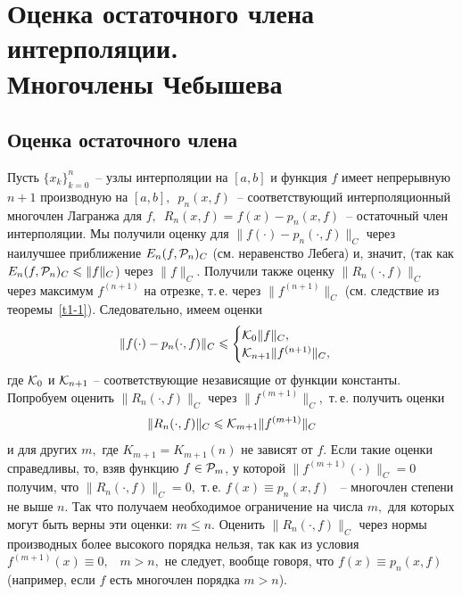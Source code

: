 
\chapter{Оценка остаточного члена интерполяции.\\
Многочлены Чебышева} %

\section{Оценка остаточного члена}

Пусть {$\{x_k\}^n_{k=0}$}~-- узлы интерполяции на $[a,b]$ и функция $f$ имеет непрерывную
${n+1}$ производную на $[a,b],$\ {$p_n(x,f)$~--
соответствующий} интерполяционный многочлен {Лагранжа} для $f,$\ $R_n(x,f)=f(x)-p_n(x,f)$~--
остаточный член интерполяции. Мы получили оценку
для $\|f(\cdot)-p_n(\cdot ,f)\|_C$ через наилучшее приближение
$E_n(f, \mathcal{P}_n)_C$ (см. неравенство Лебега) и, значит, {(}так как $E_n(f,
\mathcal{P}_n)_C \leqslant \|f\|_C${)} через $\|f\|_C.$ Получили также оценку
$\|R_n(\cdot ,f) \|_C$ через максимум $f^{(n+1)}$ на отрезке, т.\,е. через
$\|f^{(n+1)}\|_C$ (см. {следствие из теоремы~\ref{t1-1})}. Следовательно, имеем оценки
\[
  \|f(\cdot )-p_n(\cdot ,f)\|_C \leqslant
               \begin{cases}
                   \mathcal{K}_0 \|f\|_C ,\\
                   \mathcal{K}_{n+1} \|f^{(n+1)}\|_C ,
               \end{cases}
\]
где $\mathcal{K}_0$ и $\mathcal{K}_{n+1}$ -- соответствующие
независящие от функции константы. Попробуем оценить $\|R_n(\cdot ,f)\|_C$ через
{$\|f^{(m+1)}\|_C,$} т.\,е. получить оценки
\begin{equation}\label{lab1}
  \|R_n(\cdot ,f) \|_C \leqslant  \mathcal{K}_{m+1} \|f^{{(m+1)}}\|_C
\end{equation}
и для других $m,$ где $K_{m+1}=K_{m+1}(n)$ не зависят от $f.$
Если такие оценки справедливы, то, взяв функцию $f\in {\cal P}_m$,
у которой {$\|f^{(m+1)}(\cdot )\|_C=0$} получим, что $\|R_n(\cdot ,f)
\|_C=0,$ т.\,е. $f(x) \equiv p_n(x ,f)$ {~--} многочлен степени не выше
$n.$ Так что получаем {необходимое} ограничение на {числа $m,$}
для которых могут быть верны эти оценки: {$m \le n.$} Оценить $\|R_n(\cdot ,f) \|_C$
через нормы производных более высокого порядка нельзя,
так как из условия $f^{(m+1)}(x) \equiv 0,$~ $m > n,$ не следует, вообще
говоря, что $f(x) \equiv p_n(x ,f)$ (например, если $f$ есть
многочлен порядка {$m>n$}).

